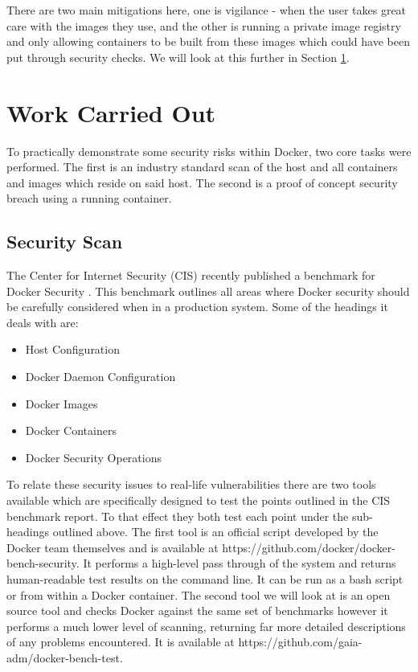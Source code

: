 \documentclass{article}
\begin{document}
There are two main mitigations here, one is vigilance - when the user takes great care with the images they use, and the other is running a private image registry and only allowing containers to be built from these images which could have been put through security checks. We will look at this further in Section \ref{sec:Work}.

\newpage
\section{Work Carried Out}
\label{sec:Work}
To practically demonstrate some security risks within Docker, two core tasks were performed. The first is an industry standard scan of the host and all containers and images which reside on said host. The second is a proof of concept security breach using a running container. 

\subsection{Security Scan}
\label{sub:scan}
The Center for Internet Security (CIS) recently published a benchmark for Docker Security \citep{CenterofInternetSecurity2016}. This benchmark outlines all areas where Docker security should be carefully considered when in a production system. Some of the headings it deals with are:

\begin{itemize}
  \item Host Configuration
  \item Docker Daemon Configuration
  \item Docker Images 
  \item Docker Containers
  \item Docker Security Operations
\end{itemize}

To relate these security issues to real-life vulnerabilities there are two tools available which are specifically designed to test the points outlined in the CIS benchmark report. To that effect they both test each point under the sub-headings outlined above. The first tool is an official script developed by the Docker team themselves and is available at https://github.com/docker/docker-bench-security. It performs a high-level pass through of the system and returns human-readable test results on the command line. It can be run as a bash script or from within a Docker container. The second tool we will look at is an open source tool and checks Docker against the same set of benchmarks however it performs a much lower level of scanning, returning far more detailed descriptions of any problems encountered. It is available at https://github.com/gaia-adm/docker-bench-test.
\end{document}
